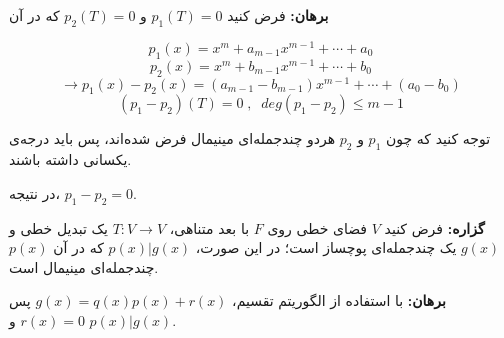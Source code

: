\textbf{برهان:}
فرض کنید $p_1(T)=0$ و $p_2(T)=0$
که در آن

$$p_1(x)=x^m+a_{m-1}x^{m-1}+\cdots+a_0$$
$$p_2(x)=x^m+b_{m-1}x^{m-1}+\cdots+b_0$$
$$\to p_1(x)-p_2(x) = (a_{m-1}-b_{m-1})x^{m-1} +\cdots + (a_0-b_0)$$
$$ (p_1-p_2)(T)=0 \; , \; \; deg(p_1-p_2)\leq m-1$$

توجه کنید که چون $p_1$ و $p_2$ هردو چندجمله‌ای مینیمال فرض شده‌اند، پس باید درجه‌ی یکسانی داشته باشند.

در نتیجه،
$p_1-p_2=0$.

\textbf{گزاره:}
فرض کنید $V$  فضای خطی روی $F$ با بعد متناهی،
$T:V\to V$
یک تبدیل خطی و $g(x)$ یک چندجمله‌ای پوچساز است؛ در این صورت،
$p(x)|g(x)$
که در آن $p(x)$ چندجمله‌ای مینیمال است.

\textbf{برهان:}
با استفاده از الگوریتم تقسیم،
$g(x)=q(x)p(x)+r(x)$
پس 
$r(x)=0$
و
$p(x)|g(x)$.




